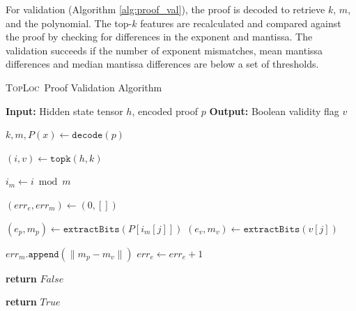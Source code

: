 \documentclass{article}
\theoremstyle{plain}
\theoremstyle{definition}
\theoremstyle{remark}
\newcommand{\toploc}{\textsc{TopLoc}}
\begin{document}
For validation (Algorithm \ref{alg:proof_val}), the proof is decoded to retrieve $k$, $m$, and the polynomial.
The top-$k$ features are recalculated and compared against the proof by checking for differences in the exponent and mantissa.
The validation succeeds if the number of exponent mismatches, mean mantissa differences and median mantissa differences are below a set of thresholds.

\begin{algorithm}[h]
    \caption{\toploc\ Proof Validation Algorithm}
    \label{alg:proof_val}
\begin{algorithmic}[1]
\STATE \textbf{Input:} Hidden state tensor $h$, encoded proof $p$
\STATE \textbf{Output:} Boolean validity flag $v$
\STATE

\STATE $k, m, P(x) \gets \texttt{decode}(p)$

\STATE $(i, v) \gets \texttt{topk}(h, k)$ 

\STATE $i_m \gets i \bmod{m}$

\STATE $(err_e, err_m) \gets (0, [])$ 

    \STATE $(e_p, m_p) \gets \texttt{extractBits}(P[i_m[j]])$ %
    \STATE $(e_v, m_v) \gets \texttt{extractBits}(v[j])$ %

        \STATE $err_m.\texttt{append}(\lVert m_p - m_v \rVert)$ 
    \ELSE
        \STATE $err_e \gets err_e + 1$ 
    \ENDIF
\ENDFOR

    \STATE \textbf{return} $False$
\ENDIF

\STATE \textbf{return} $True$

\end{algorithmic}
\end{algorithm}
\end{document}
